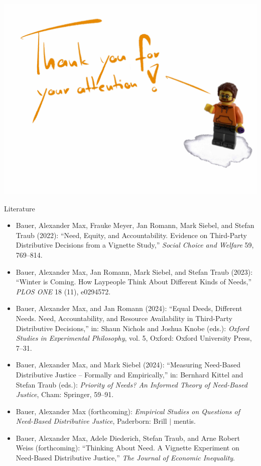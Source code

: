 \documentclass[xcolor=table,9pt,aspectratio=169]{beamer}
\begin{document}
\begin{frame}{}
\begin{center}
   \includegraphics[width=0.8\linewidth]{figures/slides_thanks_english.pdf}
\end{center}
\end{frame}


\begin{frame}{\vspace*{10mm}Literature}
\vspace*{-5mm}
{\footnotesize
\begin{itemize}[label=,leftmargin=2em,itemindent=-2em]
   \item Bauer, Alexander Max, Frauke Meyer, Jan Romann, Mark Siebel, and Stefan Traub (2022): \enquote{Need, Equity, and Accountability. Evidence on Third-Party Distributive Decisions from a Vignette Study,} \textit{Social Choice and Welfare} 59, 769--814.
   \item Bauer, Alexander Max, Jan Romann, Mark Siebel, and Stefan Traub (2023): \enquote{Winter is Coming. How Laypeople Think About Different Kinds of Needs,} \textit{PLOS ONE} 18 (11), e0294572.
   \item Bauer, Alexander Max, and Jan Romann (2024): \enquote{Equal Deeds, Different Needs. Need, Accountability, and Resource Availability in Third-Party Distributive Decisions,} in: Shaun Nichols and Joshua Knobe (eds.): \textit{Oxford Studies in Experimental Philosophy}, vol. 5, Oxford: Oxford University Press, 7--31.
   \item Bauer, Alexander Max, and Mark Siebel (2024): \enquote{Measuring Need-Based Distributive Justice -- Formally and Empirically,} in: Bernhard Kittel and Stefan Traub (eds.): \textit{Priority of Needs? An Informed Theory of Need-Based Justice}, Cham: Springer, 59--91.
   \item Bauer, Alexander Max (forthcoming): \textit{Empirical Studies on Questions of Need-Based Distributive Justice}, Paderborn: Brill $|$ mentis.
   \item Bauer, Alexander Max, Adele Diederich, Stefan Traub, and Arne Robert Weiss (forthcoming): \enquote{Thinking About Need. A Vignette Experiment on Need-Based Distributive Justice,} \textit{The Journal of Economic Inequality}.
\end{itemize}
}
\end{frame}
\end{document}
